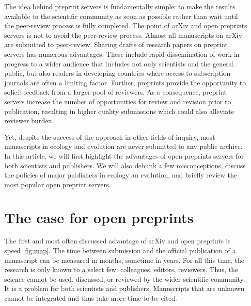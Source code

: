 \documentclass[letterpaper,twocolumn,superscriptaddress,showkeys]{revtex4}
\begin{document}
The idea behind preprint servers is fundamentally simple: to make the results
available to the scientific community as soon as possible rather than wait until
the peer-review process is fully completed. The point of arXiv and open
preprints servers is not to avoid the peer-review process. Almost all
manuscripts on arXiv are submitted to peer-review.  Sharing drafts of research
papers on preprint servers has numerous advantages. These include rapid
dissemination of work in progress to a wider audience that includes not only
scientists and the general public, but also readers in developing countries
where access to subscription journals are often a limiting factor. Further,
preprints provide the opportunity to solicit feedback from a larger pool of
reviewers. As a consequence, preprint servers increase the number of
opportunities for review and revision prior to publication, resulting in higher
quality submissions which could also alleviate reviewer burden.

Yet, despite the success of the approach in other fields of inquiry, most
manuscripts in ecology and evolution are never submitted to any public archive.
In this article, we will first highlight the advantages of open preprints
servers for both scientists and publishers. We will also debunk a few
misconceptions, discuss the policies of major publishers in ecology an
evolution, and briefly review the most popular open preprint servers.

\section{The case for open preprints}

The first and most often discussed advantage of arXiv and open preprints is
speed \ref{fig:map}. The time between submission and the official publication of
a manuscript can be measured in months, sometime in years. For all this time,
the research is only known to a select few: colleagues, editors, reviewers.
Thus, the science cannot be used, discussed, or reviewed by the wider scientific
community. It is a problem for both scientists and publishers. Manuscripts that
are unknown cannot be integrated and thus take more time to be cited.
\end{document}
